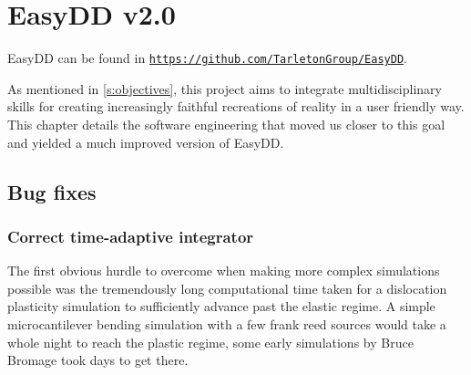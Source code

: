 \chapter{EasyDD v2.0}
\label{c:easydd}

EasyDD can be found in \href{https://github.com/TarletonGroup/EasyDD}{\texttt{https://github.com/TarletonGroup/EasyDD}}.

As mentioned in \cref{s:objectives}, this project aims to integrate multidisciplinary skills for creating increasingly faithful recreations of reality in a user friendly way. This chapter details the software engineering that moved us closer to this goal and yielded a much improved version of EasyDD.

\section{Bug fixes}
\label{s:bugs}

\subsection{Correct time-adaptive integrator}
\label{ss:integrator}

The first obvious hurdle to overcome when making more complex simulations possible was the tremendously long computational time taken for a dislocation plasticity simulation to sufficiently advance past the elastic regime. A simple microcantilever bending simulation with a few frank reed sources would take a whole night to reach the plastic regime, some early simulations by Bruce Bromage took days to get there.

